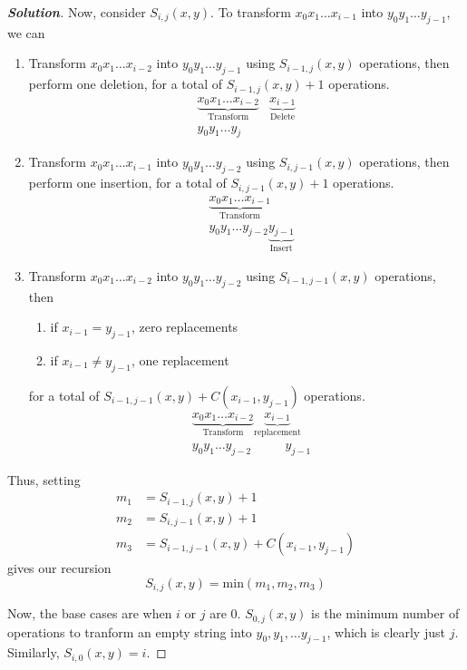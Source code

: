 \documentclass[a4paper]{article}
\newenvironment{solution}{\begin{proof}[\textnormal{\textbf{Solution}}]}{\end{proof}}
\theoremstyle{definition}
\begin{document}
\begin{solution}
   Now, consider $S_{i, j}(x, y)$. To transform $x_0x_1\hdots x_{i-1}$ into $y_0y_1\hdots y_{j-1}$, we can
\begin{enumerate}[1.]
  \item Transform $x_0x_1\hdots x_{i-2}$ into $y_0y_1\hdots y_{j-1}$ using $S_{i-1, j}(x, y)$ operations, then perform one deletion, for a total of $S_{i-1, j}(x, y) + 1$ operations.
  \begin{align*}
  \underbrace{x_0x_1\hdots x_{i-2}}_{\text{Transform}}&\underbrace{x_{i-1}}_{\text{Delete}}\\
  y_0y_1\hdots y_j&
  \end{align*}
  \item Transform $x_0x_1\hdots x_{i-1}$ into $y_0y_1\hdots y_{j-2}$ using $S_{i, j-1}(x, y)$ operations, then perform one insertion, for a total of $S_{i, j-1}(x, y) + 1$ operations.
  \begin{align*}
  &\underbrace{x_0x_1\hdots x_{i-1}}_{\text{Transform}}\\
  &y_0y_1\hdots y_{j-2}\underbrace{y_{j-1}}_{\text{Insert}}
  \end{align*}
  \item Transform $x_0x_1\hdots x_{i-2}$ into $y_0y_1\hdots y_{j-2}$ using $S_{i-1, j-1}(x, y)$ operations, then 
    \begin{enumerate}
    \item if $x_{i-1}=y_{j-1}$, zero replacements
    \item if $x_{i-1}\neq y_{j-1}$, one replacement
    \end{enumerate} for a total of $S_{i-1, j-1}(x, y)+C(x_{i-1}, y_{j-1})$ operations.
      \begin{align*}
  &\underbrace{x_0x_1\hdots x_{i-2}}_{\text{Transform}}\underbrace{x_{i-1}}_{\text{replacement}}\\
  &y_0y_1\hdots y_{j-2}\text{ }\text{ }\text{ }\text{ }y_{j-1}  \end{align*}
 \end{enumerate}
 Thus, setting \begin{align*}m_1&=S_{i-1, j}(x, y) + 1\\m_2&=S_{i, j-1}(x, y) + 1\\m_3&=S_{i-1, j-1}(x, y)+C(x_{i-1}, y_{j-1})\end{align*} gives our recursion \[S_{i,j}(x, y)=\text{min}(m_1, m_2, m_3)\]
 
 Now, the base cases are when $i$ or $j$ are 0. $S_{0, j}(x,y)$ is the minimum number of operations to tranform an empty string into $y_0, y_1,\hdots y_{j-1}$, which is clearly just $j$. Similarly, $S_{i, 0}(x,y)=i$.
\end{solution}
\end{document}
